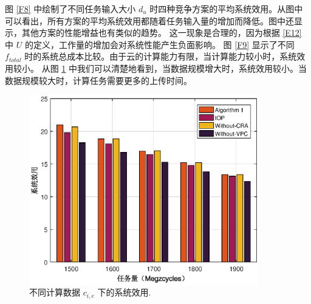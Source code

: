图 \ref{F8} 中绘制了不同任务输入大小 $d_u$ 时四种竞争方案的平均系统效用。从图中可以看出，所有方案的平均系统效用都随着任务输入量的增加而降低。图中还显示，其他方案的性能增益也有类似的趋势。
这一现象是合理的，因为根据 \eqref{E12} 中 $U$ 的定义，工作量的增加会对系统性能产生负面影响。
图 \ref{F9} 显示了不同 $f_{total}$ 时的系统总成本比较。由于云的计算能力有限，当计算能力较小时，系统效用较小。
从图 \ref{F10} 中我们可以清楚地看到，当数据规模增大时，系统效用较小。当数据规模较大时，计算任务需要更多的上传时间。
\begin{figure}[H]
\centering
\includegraphics[width=10cm]{figures//chap3//diff_c.eps}
\caption{不同计算数据 $c_{i,e}$ 下的系统效用.}
\label{F10}
\end{figure}

